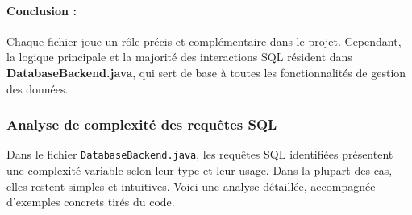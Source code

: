 \documentclass[a4paper,11pt]{article}
\begin{document}
\paragraph{Conclusion :}
Chaque fichier joue un rôle précis et complémentaire dans le projet. Cependant, la logique principale et la majorité des interactions SQL résident dans \textbf{DatabaseBackend.java}, qui sert de base à toutes les fonctionnalités de gestion des données.

\subsubsection*{Analyse de complexité des requêtes SQL}

Dans le fichier \texttt{DatabaseBackend.java}, les requêtes SQL identifiées présentent une complexité variable selon leur type et leur usage. Dans la plupart des cas, elles restent simples et intuitives. Voici une analyse détaillée, accompagnée d'exemples concrets tirés du code.
\end{document}
